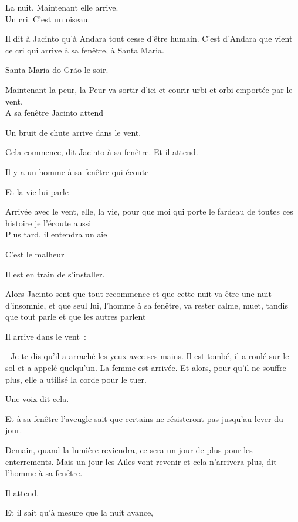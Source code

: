 La nuit. Maintenant elle arrive.\\

Un cri. C'est un oiseau.

Il dit à Jacinto qu'à Andara tout cesse d'être humain. C'est d'Andara
que vient ce cri qui arrive à sa fenêtre, à Santa Maria.

Santa Maria do Grão le soir.

Maintenant la peur, la Peur va sortir d'ici et courir urbi et orbi
emportée par le vent.\\

A sa fenêtre Jacinto attend

Un bruit de chute arrive dans le vent.

Cela commence, dit Jacinto à sa fenêtre. Et il attend.

Il y a un homme à sa fenêtre qui écoute

Et la vie lui parle

Arrivée avec le vent, elle, la vie, pour que moi qui porte le fardeau de
toutes ces histoire je l'écoute aussi\\

Plus tard, il entendra un aie

C'est le malheur

Il est en train de s'installer.

Alors Jacinto sent que tout recommence et que cette nuit va être une
nuit d'insomnie, et que seul lui, l'homme à sa fenêtre, va rester calme,
muet, tandis que tout parle et que les autres parlent

Il arrive dans le vent~:

- Je te dis qu'il a arraché les yeux avec ses mains. Il est tombé, il a
roulé sur le sol et a appelé quelqu'un. La femme est arrivée. Et alors,
pour qu'il ne souffre plus, elle a utilisé la corde pour le tuer.

Une voix dit cela.

Et à sa fenêtre l'aveugle sait que certains ne résisteront pas jusqu'au
lever du jour.

Demain, quand la lumière reviendra, ce sera un jour de plus pour les
enterrements. Mais un jour les Ailes vont revenir et cela n'arrivera
plus, dit l'homme à sa fenêtre.

Il attend.

Et il sait qu'à mesure que la nuit avance,

